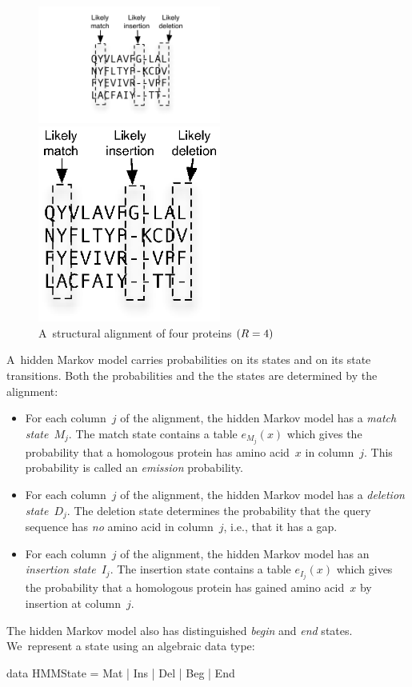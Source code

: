 \documentclass[preprint,nonatbib,blockstyle,nocopyrightspace,times]{sigplanconf}
\newcommand\alignwidth{\ensuremath R} %
\newenvironment{smallverbatim}{\par\small\verbatim}{\endverbatim}
\begin{document}
\begin{figure}
\ifpdfmadness
\centerline{\includegraphics[width=6cm]{alignment.pdf}} 
\else
\centerline{\includegraphics[width=6cm]{alignment.eps}} 
\fi



\caption{A~structural alignment of four proteins $(\alignwidth = 4)$}
\label{alignment} 
\end{figure}

A~hidden Markov model carries probabilities on its states and on its
state transitions.
Both the probabilities and the
the states are determined by the alignment:
\begin{itemize}
\item
For each column~$j$ of the alignment, the hidden Markov model has a
\emph{match state}~$M_j$.
The match state contains a table $e_{M_j}(x)$ which gives the
 probability that a homologous protein has amino acid~$x$ in
 column~$j$.
This probability is called an \emph{emission} probability.
\item
For each column~$j$ of the alignment, the hidden Markov model has a
\emph{deletion state}~$D_j$.
The deletion state determines the probability that the query sequence
has \emph{no} amino acid  in column~$j$, i.e., that it has a gap.
\item 
For each column~$j$ of the alignment, the hidden Markov model has an
\emph{insertion state}~$I_j$.
The insertion state contains a table $e_{I_j}(x)$ which gives the
probability that a homologous protein has gained amino acid~$x$ by
insertion at column~$j$.
\end{itemize}
The hidden Markov model also has distinguished \emph{begin} and \emph{end} states.
We~represent a state using an algebraic data type:
\begin{smallverbatim}
data HMMState = Mat | Ins | Del | Beg | End
\end{smallverbatim}
\end{document}
